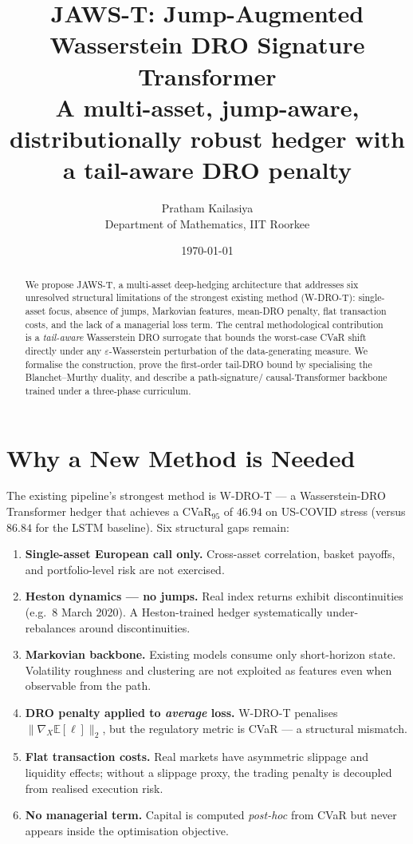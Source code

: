 \documentclass[11pt,a4paper]{article}
\title{JAWS-T: Jump-Augmented Wasserstein DRO Signature Transformer\\
  \large A multi-asset, jump-aware, distributionally robust hedger with a
  tail-aware DRO penalty}
\author{Pratham Kailasiya\\Department of Mathematics, IIT Roorkee}
\date{\today}
\begin{document}
\maketitle

\begin{abstract}
We propose JAWS-T, a multi-asset deep-hedging architecture that addresses six
unresolved structural limitations of the strongest existing method
(W-DRO-T): single-asset focus, absence of jumps, Markovian features, mean-DRO
penalty, flat transaction costs, and the lack of a managerial loss term. The
central methodological contribution is a \emph{tail-aware} Wasserstein DRO
surrogate that bounds the worst-case CVaR shift directly under any
$\varepsilon$-Wasserstein perturbation of the data-generating measure. We
formalise the construction, prove the first-order tail-DRO bound by
specialising the Blanchet--Murthy duality, and describe a path-signature/
causal-Transformer backbone trained under a three-phase curriculum.
\end{abstract}

\section{Why a New Method is Needed}

The existing pipeline's strongest method is W-DRO-T --- a Wasserstein-DRO
Transformer hedger that achieves a CVaR$_{95}$ of $46.94$ on US-COVID stress
(versus $86.84$ for the LSTM baseline). Six structural gaps remain:

\begin{enumerate}[leftmargin=*]
  \item \textbf{Single-asset European call only.} Cross-asset correlation,
    basket payoffs, and portfolio-level risk are not exercised.
  \item \textbf{Heston dynamics --- no jumps.} Real index returns exhibit
    discontinuities (e.g.\ 8 March 2020). A Heston-trained hedger systematically
    under-rebalances around discontinuities.
  \item \textbf{Markovian backbone.} Existing models consume only short-horizon
    state. Volatility roughness and clustering are not exploited as features
    even when observable from the path.
  \item \textbf{DRO penalty applied to \emph{average} loss.} W-DRO-T penalises
    $\|\nabla_X \mathbb{E}[\ell]\|_2$, but the regulatory metric is CVaR ---
    a structural mismatch.
  \item \textbf{Flat transaction costs.} Real markets have asymmetric slippage
    and liquidity effects; without a slippage proxy, the trading penalty is
    decoupled from realised execution risk.
  \item \textbf{No managerial term.} Capital is computed \emph{post-hoc} from
    CVaR but never appears inside the optimisation objective.
\end{enumerate}
\end{document}
